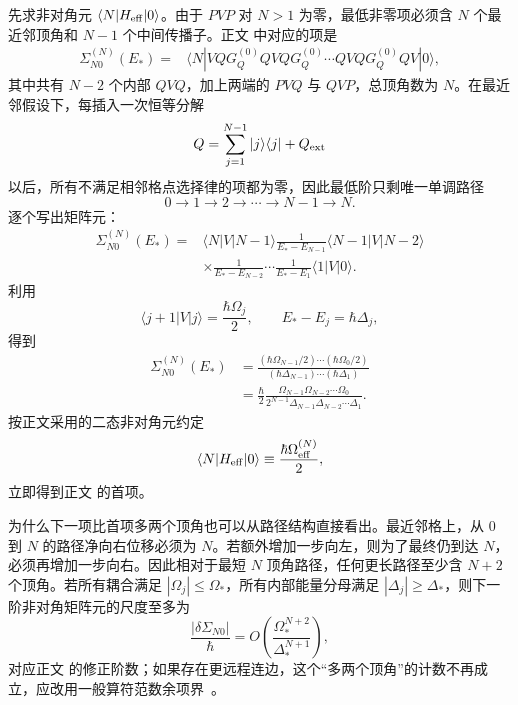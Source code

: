 \begin{derivation}[虚通道链中的有效耦合与能级移动]
先求非对角元 $\langle N|H_{\rm eff}|0\rangle$。由于 $PVP$ 对 $N>1$ 为零，最低非零项必须含 $N$ 个最近邻顶角和 $N-1$ 个中间传播子。正文 中对应的项是
\begin{align*}
 \Sigma_{N0}^{(N)}(E_*)
 ={}&\langle N|VQG_Q^{(0)}QVQG_Q^{(0)}\cdots
 QVQG_Q^{(0)}QV|0\rangle,
\end{align*}
其中共有 $N-2$ 个内部 $QVQ$，加上两端的 $PVQ$ 与 $QVP$，总顶角数为 $N$。在最近邻假设下，每插入一次恒等分解
\begin{equation*}
 Q=\sum_{j=1}^{N-1}|j\rangle\langle j|+Q_{\rm ext}
\end{equation*}
以后，所有不满足相邻格点选择律的项都为零，因此最低阶只剩唯一单调路径
\begin{equation*}
 0\to1\to2\to\cdots\to N-1\to N.
\end{equation*}
逐个写出矩阵元：
\begin{align*}
 \Sigma_{N0}^{(N)}(E_*)
 ={}&\langle N|V|N-1\rangle
 \frac1{E_*-E_{N-1}}
 \langle N-1|V|N-2\rangle\\
 &\times\frac1{E_*-E_{N-2}}
 \cdots
 \frac1{E_*-E_1}
 \langle1|V|0\rangle.
\end{align*}
利用
\begin{equation*}
 \langle j+1|V|j\rangle=\frac{\hbar\Omega_j}{2},
 \qquad
 E_*-E_j=\hbar\Delta_j,
\end{equation*}
得到
\begin{align*}
 \Sigma_{N0}^{(N)}(E_*)
 &=\frac{(\hbar\Omega_{N-1}/2)\cdots(\hbar\Omega_0/2)}
 {(\hbar\Delta_{N-1})\cdots(\hbar\Delta_1)}\\
 &=\frac{\hbar}{2}
 \frac{\Omega_{N-1}\Omega_{N-2}\cdots\Omega_0}
 {2^{N-1}\Delta_{N-1}\Delta_{N-2}\cdots\Delta_1}.
\end{align*}
按正文采用的二态非对角元约定
\begin{equation*}
 \langle N|H_{\rm eff}|0\rangle
 \equiv\frac{\hbar\Omega_{\rm eff}^{(N)}}2,
\end{equation*}
立即得到正文 的首项。

为什么下一项比首项多两个顶角也可以从路径结构直接看出。最近邻格上，从 $0$ 到 $N$ 的路径净向右位移必须为 $N$。若额外增加一步向左，则为了最终仍到达 $N$，必须再增加一步向右。因此相对于最短 $N$ 顶角路径，任何更长路径至少含 $N+2$ 个顶角。若所有耦合满足 $|\Omega_j|\le\Omega_*$，所有内部能量分母满足 $|\Delta_j|\ge\Delta_*$，则下一阶非对角矩阵元的尺度至多为
\begin{equation*}
 \frac{|\delta\Sigma_{N0}|}{\hbar}
 =O\!\left(
 \frac{\Omega_*^{N+2}}{\Delta_*^{N+1}}
 \right),
\end{equation*}
对应正文 的修正阶数；如果存在更远程连边，这个“多两个顶角”的计数不再成立，应改用一般算符范数余项界~。


\end{derivation}
